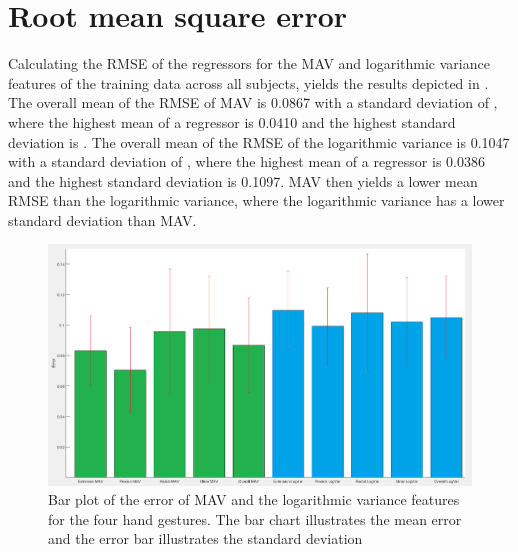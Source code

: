 \section{Root mean square error}
Calculating the RMSE of the regressors for the MAV and logarithmic variance features of the training data across all subjects, yields the results depicted in . The overall mean of the RMSE of MAV is 0.0867 with a standard deviation of , where the highest mean of a regressor is 0.0410 and the highest standard deviation is . The overall mean of the RMSE of the logarithmic variance is 0.1047 with a standard deviation of , where the highest mean of a regressor is 0.0386 and the highest standard deviation is 0.1097. MAV then yields a lower mean RMSE than the logarithmic variance, where the logarithmic variance has a lower standard deviation than MAV. 

\begin{figure}[H]
	\includegraphics[width=.4\textwidth]{figures/results/gimmeThemRMSEBars}  %
	\caption{Bar plot of the error of MAV and the logarithmic variance features for the four hand gestures. The bar chart illustrates the mean error and the error bar illustrates the standard deviation}
	\label{fig:gimmeThemRMSEBars}  %
\end{figure}